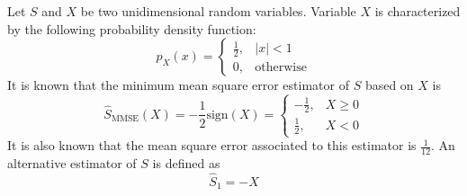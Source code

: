 \else

\question Let $S$ and $X$ be two unidimensional random variables. Variable $X$ is characterized by the following probability density function:
 $$p_X(x) =  \left\{\begin{array}{ll}
						  	\displaystyle
								  \frac{1}{2}, & |x|<1 \\
	  							  0, & {\mbox{otherwise}} 
	 					 \end{array} 
						  \right. $$   
It is known that the minimum mean square error estimator of $S$ based on $X$ is
 $$\hat{S}_\text{MMSE}(X)= - \frac{1}{2} \mbox{sign}\left(X \right)   =  \left\{\begin{array}{ll}
						  	\displaystyle
								 - \frac{1}{2}, & X \geq 0 \\
	  							 \displaystyle\frac{1}{2}, & X< 0
	 					 \end{array} 
						  \right. $$   
It is also known that the mean square error associated to this estimator is $\displaystyle\frac{1}{12}$. An alternative estimator of $S$ is defined as $$\hat{S}_1=-X$$

\begin{solution}
\end{solution}

\fi